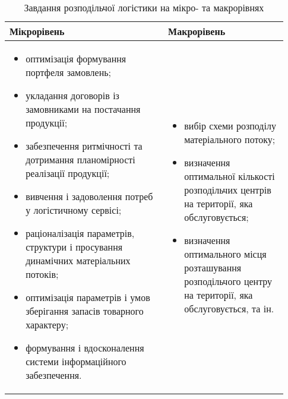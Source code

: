 \begin{table}[H]
	\caption{Завдання розподільчої логістики на мікро- та макрорівнях}
	\label{tab:logistic_functions}
	\begin{tabular}{@{}|p{0.53\linewidth}|p{0.4\linewidth}|@{}}
		\hline
		Мікрорівень & Макрорівень \\ \hline
		\begin{itemize}[leftmargin=*]
			\item оптимізація формування портфеля замовлень;
			\item укладання договорів із замовниками на постачання продукції;
			\item забезпечення ритмічності та дотримання планомірності реалізації продукції;
			\item вивчення і задоволення потреб у логістичному сервісі;
			\item раціоналізація параметрів, структури і просування динамічних матеріальних потоків;
			\item оптимізація параметрів і умов зберігання запасів товарного характеру;
			\item формування і вдосконалення системи інформаційного забезпечення.
		\end{itemize}
		            &
		\begin{itemize}[leftmargin=*]
			\item вибір схеми розподілу матеріального потоку;
			\item визначення оптимальної кількості розподільчих центрів на території, яка обслуговується;
			\item визначення оптимального місця розташування розподільчого центру на території, яка обслуговується, та ін.
		\end{itemize} \\ \hline
	\end{tabular}
\end{table}


